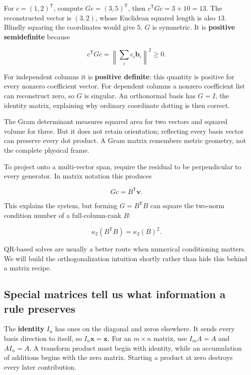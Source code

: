 For \(c=(1,2)^\mathsf T\), compute \(Gc=(3,5)^\mathsf T\), then \(c^\mathsf TGc=3+10=13\). The reconstructed vector is \((3,2)\), whose Euclidean squared length is also \(13\). Blindly squaring the coordinates would give \(5\). \(G\) is symmetric. It is \textbf{positive semidefinite} because

\[
c^\mathsf TGc=\left\|\sum_i c_i\mathbf b_i\right\|^2\ge0.
\]

For independent columns it is \textbf{positive definite}: this quantity is positive for every nonzero coefficient vector. For dependent columns a nonzero coefficient list can reconstruct zero, so \(G\) is singular. An orthonormal basis has \(G=I\), the identity matrix, explaining why ordinary coordinate dotting is then correct.

The Gram determinant measures squared area for two vectors and squared volume for three. But it does not retain orientation; reflecting every basis vector can preserve every dot product. A Gram matrix remembers metric geometry, not the complete physical frame.

To project onto a multi-vector span, require the residual to be perpendicular to every generator. In matrix notation this produces

\[
Gc=B^\mathsf T\mathbf v.
\]

This explains the system, but forming \(G=B^\mathsf TB\) can square the two-norm condition number of a full-column-rank \(B\):

\[
\kappa_2(B^\mathsf TB)=\kappa_2(B)^2.
\]

QR-based solves are usually a better route when numerical conditioning matters. We will build the orthogonalization intuition shortly rather than hide this behind a matrix recipe.

\subsection{Special matrices tell us what information a rule preserves}\label{01-foundations-i-ch018-special-matrices-tell-us-what-information-a-rule-preserves}

The \textbf{identity} \(I_n\) has ones on the diagonal and zeros elsewhere. It sends every basis direction to itself, so \(I_n\mathbf x=\mathbf x\). For an \(m\times n\) matrix, use \(I_mA=A\) and \(AI_n=A\). A transform product must begin with identity, while an accumulation of additions begins with the zero matrix. Starting a product at zero destroys every later contribution.

